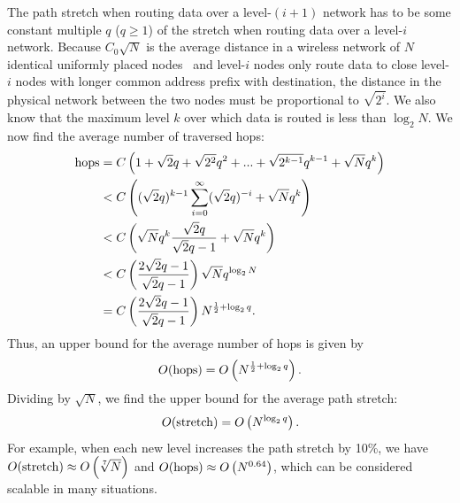 \documentclass[conference]{IEEEtran}
\theoremstyle{definition}
\begin{document}
The path stretch when routing data over a level-$(i+1)$ network has to be some constant multiple $q$ ($q \ge 1$) of the stretch when routing data over a level-$i$ network. Because $C_0\sqrt{N}$ is the average distance in a wireless network of $N$ identical uniformly placed nodes~\cite{Kleinrock} and level-$i$ nodes only route data to close level-$i$ nodes with longer common address prefix with destination, the distance in the physical network between the two nodes must be proportional to $\sqrt{2^i}$. We also know that the maximum level $k$ over which data is routed is less than $\log_2N$. We now find the average number of traversed hops:
\begin{equation*}
\begin{split}
    {\rm hops} & = C \left (1 + \sqrt{2} q + \sqrt{2^2} q^2  + ... + \sqrt{2^{k-1}} q^{k-1} + \sqrt{N} q^k \right ) \\
              & < C \left( (\sqrt{2} q)^{k-1} \sum_{i = 0}^{\infty} (\sqrt{2}q)^{-i} + \sqrt{N} q^k \right ) \\
               & < C \left ( \sqrt{N} q^k \frac{\sqrt{2} q}{\sqrt{2}q - 1} + \sqrt{N} q^k \right )  \\
               & < C \left ( \frac{2\sqrt{2}q - 1}{\sqrt{2}q - 1} \right ) \sqrt{N} q^{\log_2 N}  \\
               & = C \left ( \frac{2\sqrt{2}q - 1}{\sqrt{2}q - 1} \right ) N^{\frac{1}{2} + \log_2 q} .
\end{split}
\end{equation*}
Thus, an upper bound for the average number of hops is given by
\begin{equation*}
    O({\rm hops}) = O \left ( N^{\frac{1}{2} + \log_2 q} \right ) .
\end{equation*}
Dividing by $\sqrt{N}$, we find the upper bound for the average path stretch:
\begin{equation*}
    O({\rm stretch}) = O \left ( N^{\log_2 q} \right ) .
\end{equation*}
For example, when each new level increases the path stretch by 10\%, we have $O({\rm stretch}) \approx O \left ( \sqrt[7]{N} \right )$ and $O({\rm hops}) \approx O \left ( N^{0.64} \right )$, which can be considered scalable in many situations. 
\end{document}
